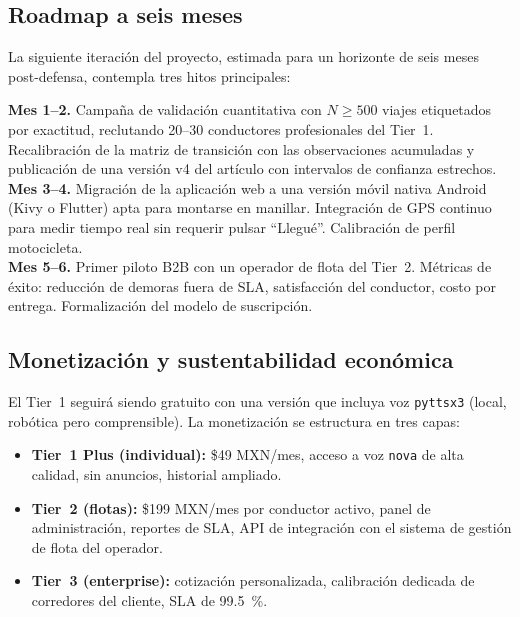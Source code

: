 \documentclass[11pt,a4paper]{article}
\begin{document}
\subsection{Roadmap a seis meses}

La siguiente iteración del proyecto, estimada para un horizonte
de seis meses post-defensa, contempla tres hitos principales:

\begin{keybox}
\textbf{\textcolor{vialTeal}{Mes 1--2.}} Campaña de validación
cuantitativa con $N\geq\num{500}$ viajes etiquetados por
exactitud, reclutando \num{20}--\num{30} conductores
profesionales del Tier~1. Recalibración de la matriz de
transición con las observaciones acumuladas y publicación de
una versión v4 del artículo con intervalos de confianza
estrechos.\\[0.3em]
\textbf{\textcolor{vialTeal}{Mes 3--4.}} Migración de la
aplicación web a una versión móvil nativa Android (Kivy o
Flutter) apta para montarse en manillar. Integración de GPS
continuo para medir tiempo real sin requerir pulsar ``Llegué''.
Calibración de perfil motocicleta.\\[0.3em]
\textbf{\textcolor{vialTeal}{Mes 5--6.}} Primer piloto B2B con
un operador de flota del Tier~2. Métricas de éxito: reducción de
demoras fuera de SLA, satisfacción del conductor, costo por
entrega. Formalización del modelo de suscripción.
\end{keybox}

\subsection{Monetización y sustentabilidad económica}

El Tier~1 seguirá siendo gratuito con una versión que incluya
voz \texttt{pyttsx3} (local, robótica pero comprensible). La
monetización se estructura en tres capas:

\begin{itemize}
\item \textbf{Tier~1 Plus (individual):} \$\num{49} MXN/mes,
acceso a voz \texttt{nova} de alta calidad, sin anuncios,
historial ampliado.
\item \textbf{Tier~2 (flotas):} \$\num{199} MXN/mes por
conductor activo, panel de administración, reportes de
SLA, API de integración con el sistema de gestión de flota del
operador.
\item \textbf{Tier~3 (enterprise):} cotización personalizada,
calibración dedicada de corredores del cliente, SLA de
\SI{99.5}{\percent}.
\end{itemize}
\end{document}
